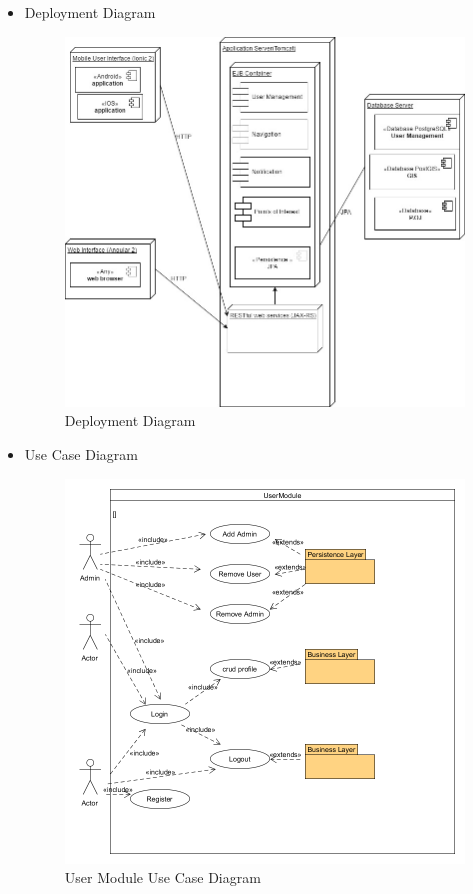 \documentclass{article}
\begin{document}
\begin{itemize}
	 			\item Deployment Diagram				
	 			\begin{center}
	 				\begin{figure}[!h]
	 					\includegraphics[scale=0.6]{DeploymentDiagram.jpg}
	 					\caption{Deployment Diagram}
	 				\end{figure}
	 			\end{center}
	 			
	 			\item Use Case Diagram
	 			\begin{center}
	 				\begin{figure}[!h]
	 					\includegraphics[scale=0.5]{uuc1.png}
	 					\caption{User Module Use Case Diagram}
	 				\end{figure}
	 			\end{center}
	 			\pagebreak
	 			

\end{itemize}
\end{document}
